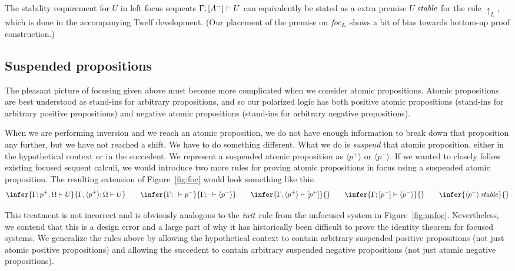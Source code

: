 \documentclass[acmtocl]{robtrans}\pdfoutput=1
\newcommand{\susp}[1]{\langle{#1}\rangle}
\newcommand{\rfoc}[2]{{#1} \vdash [{#2}] \mathstrut}
\newcommand{\lfoc}[3]{{#1}; [{#2}] \vdash {#3} \mathstrut}
\newcommand{\ifoc}[3]{{#1}; {#2} \vdash {#3} \mathstrut}
\newcommand{\stable}[1]{{#1}\,\mathit{stable} \mathstrut}
\begin{document}
The stability requirement for $U$ in left focus sequents
$\lfoc{\Gamma}{A^-}{U}$ can equivalently be stated as a extra premise
$\stable{U}$ for the rule ${\uparrow}_L$, which is done in the
accompanying Twelf development. (Our placement of the premise on ${\it
  foc}_L$ shows a bit of bias towards bottom-up proof construction.)

\subsection{Suspended propositions}\label{sec:susp}

The pleasant picture of focusing given above must become more
complicated when we
consider atomic propositions. Atomic propositions are best understood
as stand-ins for arbitrary propositions, and so our polarized logic
has both positive atomic propositions (stand-ins for arbitrary
positive propositions) and negative atomic propositions (stand-ins for
arbitrary negative propositions).


When we are performing inversion and we reach an atomic proposition,
we do not have enough information to break down that proposition any
further, but we have not reached a shift. We have to do something
different. What we do is {\it suspend} that atomic proposition, either
in the hypothetical context or in the succedent. We represent a
suspended atomic proposition as $\susp{p^+}$ or $\susp{p^-}$. If we
wanted to closely follow existing focused sequent calculi, we would
introduce two more rules for proving atomic propositions in focus
using a suspended atomic proposition. The resulting extension of
Figure~\ref{fig:foc} would look something like this:
\[
\infer
{\ifoc{\Gamma}{p^+, \Omega}{U}}
{\ifoc{\Gamma, \susp{p^+}}{\Omega}{U}}
\qquad
\infer
{\ifoc{\Gamma}{\cdot}{p^-}}
{\ifoc{\Gamma}{\cdot}{\susp{p^-}}}
\qquad
\infer
{\rfoc{\Gamma, \susp{p^+}}{p^+}}
{}
\qquad
\infer
{\lfoc{\Gamma}{p^-}{\susp{p^-}}}
{}
\qquad
\infer
{\stable{\susp{p^-}}}
{}
\]

This treatment is not incorrect and is obviously analogous to the ${\it
  init}$ rule from the unfocused system in
Figure~\ref{fig:unfoc}. Nevertheless, we contend that this is a design
error and a large part of why it has historically been difficult to
prove the identity theorem for focused systems. We generalize the
rules above
by allowing the hypothetical context to contain arbitrary
suspended positive propositions (not just atomic positive
propositions) and allowing the succedent to contain arbitrary
suspended negative propositions (not just atomic negative
propositions).
\end{document}

